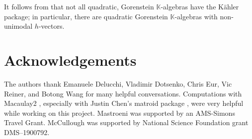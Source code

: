 \documentclass[11pt, reqno]{amsart}
\newcommand{\kk}{\mathbb{K}}					%
\theoremstyle{definition}
\numberwithin{equation}{section}
\numberwithin{table}{section}
\begin{document}
\begin{spacing}{1.1}
It follows from \cite[Theorem 4.3]{MS20} that not all quadratic, Gorenstein $\kk$-algebras have the K\"ahler package; in particular, there are quadratic Gorenstein $\kk$-algebras with non-unimodal $h$-vectors.

\section*{Acknowledgements}
The authors thank Emanuele Delucchi, Vladimir Dotsenko, Chris Eur, Vic Reiner, and Botong Wang for many helpful conversations. 
Computations with Macaulay2 \cite{M2}, especially with Justin Chen's matroid package \cite{Che19}, were very helpful while working on this project.  Mastroeni was supported by an AMS-Simons Travel Grant.  McCullough was supported by National Science Foundation grant DMS--1900792. 
\end{spacing}




\end{document}
